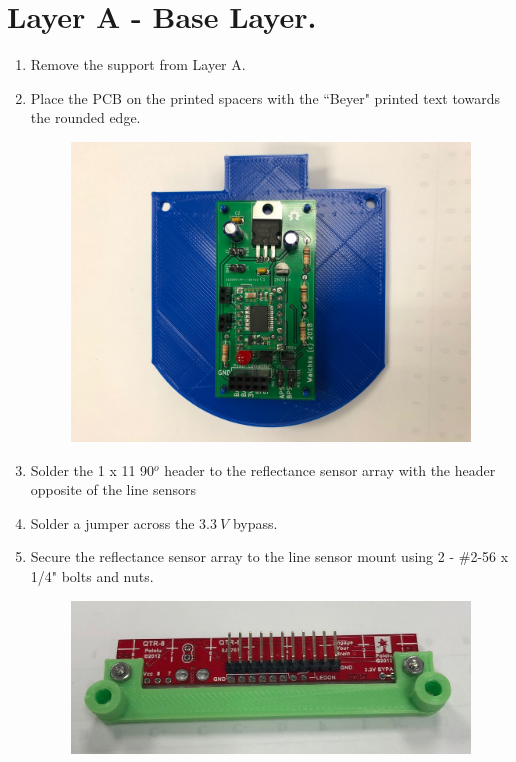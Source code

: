 \documentclass{handout}
\begin{document}
	\section{Layer A - Base Layer.}
	\begin{enumerate}
		\item Remove the support from Layer A.
		\item Place the PCB on the printed spacers with the ``Beyer" printed text towards the rounded edge.
		
		\begin{figure} [H]
			\centering
			\includegraphics[width=.75\textwidth]{1.jpg}
		\end{figure}
	
		\item Solder the 1 x 11 90$^o$ header to the reflectance sensor array with the header opposite of the line sensors
		
		\item Solder a jumper across the $3.3\ V$ bypass.
		
		\item Secure the reflectance sensor array to the line sensor mount using 2 - \#2-56 x 1/4" bolts and nuts.
		
		\begin{figure} [H]
			\centering
			\includegraphics[width=.75\textwidth]{2.jpg}
		\end{figure}
	\end{enumerate}
	
\end{document}
